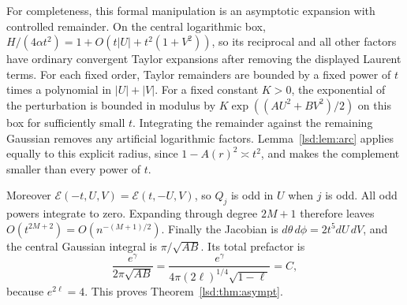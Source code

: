 \documentclass[11pt]{article}
\theoremstyle{remark}\newtheorem{remark}{Remark}
\begin{document}
For completeness, this formal manipulation is an asymptotic expansion with controlled remainder. On the central logarithmic box, $H/(4\alpha t^2)=1+O(t|U|+t^2(1+V^2))$, so its reciprocal and all other factors have ordinary convergent Taylor expansions after removing the displayed Laurent terms. For each fixed order, Taylor remainders are bounded by a fixed power of $t$ times a polynomial in $|U|+|V|$. For a fixed constant $K>0$, the exponential of the perturbation is bounded in modulus by $K\exp((AU^2+BV^2)/2)$ on this box for sufficiently small $t$. Integrating the remainder against the remaining Gaussian removes any artificial logarithmic factors. Lemma~\ref{lsd:lem:arc} applies equally to this explicit radius, since $1-A(r)^2\asymp t^2$, and makes the complement smaller than every power of $t$.

Moreover $\mathcal E(-t,U,V)=\mathcal E(t,-U,V)$, so $Q_j$ is odd in $U$ when $j$ is odd. All odd powers integrate to zero. Expanding through degree $2M+1$ therefore leaves $O(t^{2M+2})=O(n^{-(M+1)/2})$.
Finally the Jacobian is $d\theta\,d\phi=2t^5dU\,dV$, and the central Gaussian integral is $\pi/\sqrt{AB}$. Its total prefactor is
\[
 \frac{e^\gamma}{2\pi\sqrt{AB}}=\frac{e^\gamma}{4\pi(2\ell)^{1/4}\sqrt{1-\ell}}=C,
\]
because $e^{2\ell}=4$. This proves Theorem~\ref{lsd:thm:asympt}.
\end{document}
